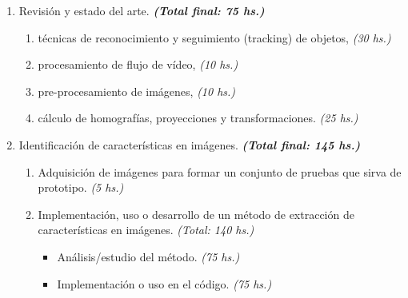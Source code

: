 \documentclass[a4paper,11pt,spanish]{article}
\begin{document}
\begin{enumerate}
    \item Revisión y estado del arte. \textbf{\textit{(Total final: 75 hs.)}}
      \begin{enumerate}
	Recopilación bibliográfica: 
 	\item técnicas de reconocimiento y seguimiento (tracking) de objetos, \textit{(30 hs.)}
	\item procesamiento de flujo de vídeo, \textit{(10 hs.)}
	\item pre-procesamiento de imágenes, \textit{(10 hs.)}
	\item cálculo de homografías, proyecciones y transformaciones. \textit{(25 hs.)}
      \end{enumerate}
% 	
% 	
	
	\item Identificación de características en imágenes. \textbf{\textit{(Total final: 145 hs.)}}
	  \begin{enumerate} 
	    \item Adquisición de imágenes para formar un conjunto de pruebas que sirva de prototipo. \textit{(5 hs.)}
	    \item Implementación, uso o desarrollo de un método de extracción de características en imágenes. \textit{(Total: 140 hs.)}
	      \begin{itemize}
	       \item Análisis/estudio del método. \textit{(75 hs.)}
	       \item Implementación o uso en el código. \textit{(75 hs.)}
	      \end{itemize}
	  \end{enumerate}



\end{enumerate}
\end{document}
